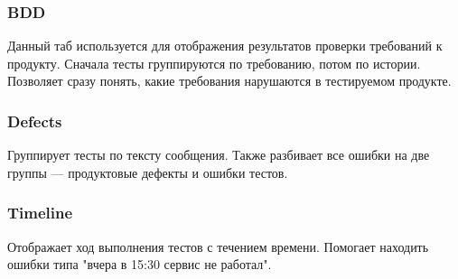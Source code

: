 \subsubsection{BDD}

Данный таб используется для отображения результатов проверки требований к продукту. Сначала тесты группируются по требованию, потом по истории. Позволяет сразу понять, какие требования нарушаются в тестируемом продукте.

\subsubsection{Defects}

Группирует тесты по тексту сообщения. Также разбивает все ошибки на две группы --- продуктовые дефекты и ошибки тестов. 

\subsubsection{Timeline}

Отображает ход выполнения тестов с течением времени. Помогает находить ошибки типа "вчера в 15:30 сервис не работал".
